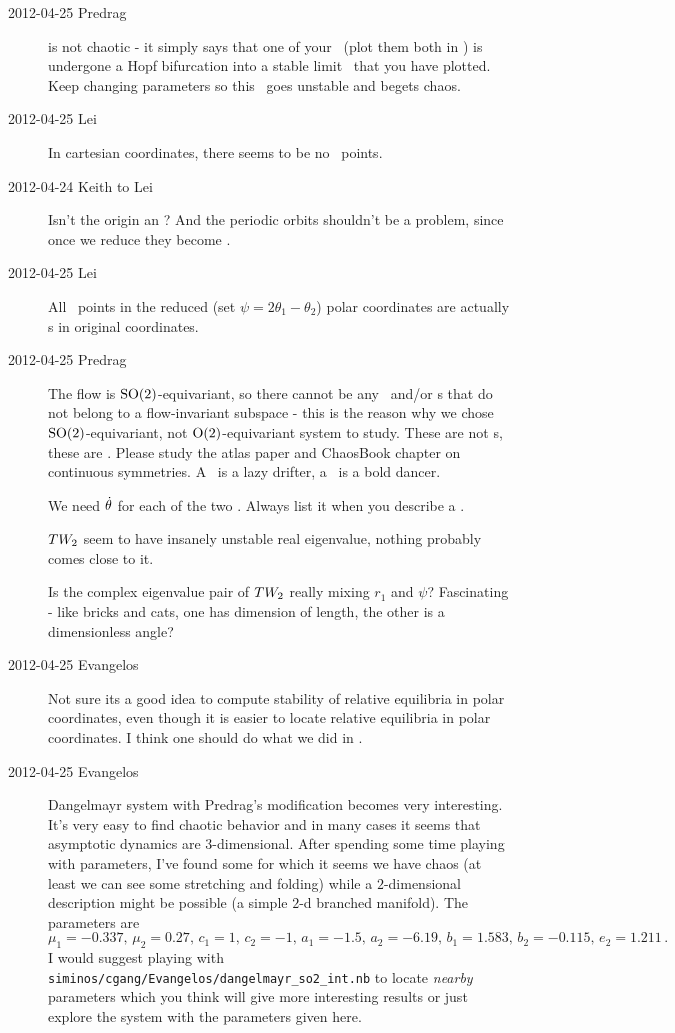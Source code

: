 \begin{description}
\item[2012-04-25 Predrag]  is not chaotic -
it simply says that one of your \reqva\ (plot them both in
) is undergone a Hopf bifurcation into a
stable limit \rpo\ that you have plotted. Keep changing parameters so
this \rpo\ goes unstable and begets chaos.

\item[2012-04-25 Lei]
In cartesian coordinates, there seems to be no \eqv\ points.

\item[2012-04-24 Keith to Lei]  Isn't the origin an \eqv?  And the
periodic orbits shouldn't be a problem, since once we reduce they become
\eqv.

\item[2012-04-25 Lei]
All \eqva\ points in the reduced (set $\psi=2\theta_1-\theta_2$)
polar coordinates are actually \po s in original coordinates.

\item[2012-04-25 Predrag]  The flow is $\textrm{SO}(2)$-equivariant, so there
cannot be any \eqva\ and/or \po s that do not belong to a flow-invariant
subspace - this is {\color{red} the reason why we chose}
$\textrm{SO}(2)$-equivariant, not $\textrm{O}(2)$-equivariant system to study. These
are {\color{red} not} \po s, these are \reqva. Please study the atlas
paper and ChaosBook chapter on continuous symmetries. A \reqv\ is a lazy
drifter, a \rpo\ is a bold dancer.

We need $\dot{\theta}$ for each of the two \reqva. Always list it when
you describe a \reqv.

$TW_{2}$ seem to have insanely unstable real
eigenvalue, nothing probably comes close to it.

Is the complex eigenvalue pair of $TW_{2}$ really mixing $r_1$ and $\psi$?
Fascinating - like bricks and cats, one has dimension of length, the other is
a dimensionless angle?

\item[2012-04-25 Evangelos] Not sure its a good idea to compute stability
of relative equilibria in polar coordinates, even though it is easier to locate
relative equilibria in polar coordinates. I think one should do what we did
in .

\item[2012-04-25 Evangelos] Dangelmayr system with Predrag's modification
becomes very interesting. It's very easy to find chaotic behavior and in many
cases it seems that asymptotic dynamics are $3$-dimensional.
After spending some time playing with parameters, I've found some
for which it seems we have chaos (at least we can see some stretching
and folding) while a $2$-dimensional description might be possible
(a simple $2$-d branched manifold).
The parameters are
\[
 \mu_1 = -0.337,\, \mu_2 = 0.27,\, c_1 = 1,\, c_2 = -1,\, a_1 = -1.5,\,
 a_2 = -6.19,\, b_1 = 1.583,\,  b_2 = -0.115,\, e_2 = 1.211\,.
\]
I would suggest playing with \texttt{siminos/cgang/Evangelos/dangelmayr\_so2\_int.nb}
to locate \emph{nearby} parameters which you think will give more interesting
results or just explore the system with the parameters given here.


\end{description}
